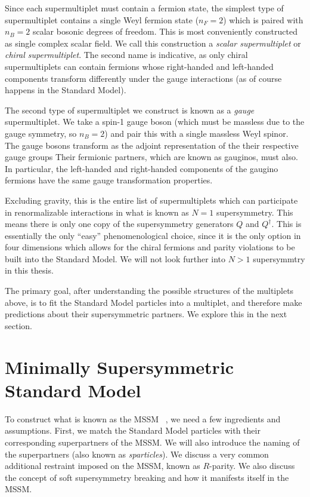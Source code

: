 Since each supermultiplet must contain a fermion state, the simplest type of supermultiplet contains a single Weyl fermion state ($n_F = 2$) which is paired with $n_B = 2$ scalar bosonic degrees of freedom.
This is most conveniently constructed as single complex scalar field.
We call this construction a \textit{scalar supermultiplet} or \textit{chiral supermultiplet}.
The second name is indicative, as only chiral supermultiplets can contain fermions whose right-handed and left-handed components transform differently under the gauge interactions (as of course happens in the Standard Model).

The second type of supermultiplet we construct is known as a \textit{gauge} supermultiplet.
We take a spin-1 gauge boson (which must be massless due to the gauge symmetry, so $n_B = 2$) and pair this with a single massless Weyl spinor\footnotemark.
The gauge bosons transform as the adjoint representation of the their respective gauge groups
Their fermionic partners, which are known as gauginos, must also.
In particular, the left-handed and right-handed components of the gaugino fermions have the same gauge transformation properties.

Excluding gravity, this is the entire list of supermultiplets which can participate in renormalizable interactions in what is known as $N=1$ supersymmetry.
This means there is only one copy of the supersymmetry generators $Q$ and $Q^\dagger$.
This is essentially the only ``easy'' phenomenological choice, since it is the only option in four dimensions which allows for the chiral fermions and parity violations to be built into the Standard Model.
We will not look further into $N>1$ supersymmtry in this thesis.

The primary goal, after understanding the possible structures of the multiplets above, is to fit the Standard Model particles into a multiplet, and therefore make predictions about their supersymmetric partners.
We explore this in the next section.

\section{Minimally Supersymmetric Standard Model}

To construct what is known as the MSSM ~\cite{Dimopoulos:1981zb,Dimopoulos:1981yj,Ibanez:1981yh,Marciano:1981un,susyPrimer}, we need a few ingredients and assumptions.
First, we match the Standard Model particles with their corresponding superpartners of the MSSM.
We will also introduce the naming of the superpartners (also known as \textit{sparticles}).
We discuss a very common additional restraint imposed on the MSSM, known as $R$-parity.
We also discuss the concept of soft supersymmetry breaking and how it manifests itself in the MSSM.

